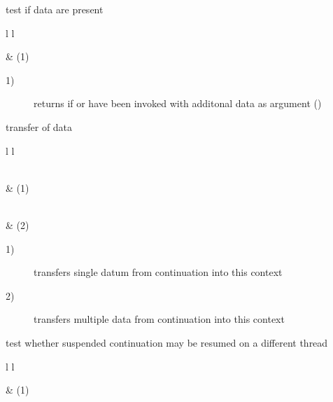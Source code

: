 
test if data are present\\

\begin{tabular}{ l l }
    \midrule

     & (1)\\

    \midrule
\end{tabular}

\begin{description}
    \item[1)] returns  if \call or \resume have been invoked with
              additonal data as argument ()
\end{description}



transfer of data\\

\begin{tabular}{ l l }
    \midrule

    \\
     & (1)\\

    \midrule

    \\
     & (2)\\

    \midrule
\end{tabular}

\begin{description}
    \item[1)] transfers single datum from continuation  into this context
    \item[2)] transfers multiple data from continuation  into this
              context
\end{description}



test whether suspended continuation may be resumed on a different thread\\

\begin{tabular}{ l l }
    \midrule

     & (1)\\

    \midrule
\end{tabular}

